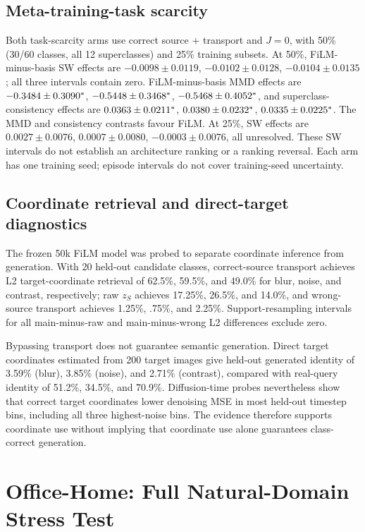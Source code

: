 \subsection{Meta-training-task scarcity}
Both task-scarcity arms use correct source $+$ transport and $J=0$, with 50\% (30/60 classes, all 12 superclasses) and 25\% training subsets. At 50\%, FiLM-minus-basis SW effects are $-0.0098\pm0.0119$, $-0.0102\pm0.0128$, $-0.0104\pm0.0135$; all three intervals contain zero. FiLM-minus-basis MMD effects are $-0.3484\pm0.3090^{\ast}$, $-0.5448\pm0.3468^{\ast}$, $-0.5468\pm0.4052^{\ast}$, and superclass-consistency effects are $0.0363\pm0.0211^{\ast}$, $0.0380\pm0.0232^{\ast}$, $0.0335\pm0.0225^{\ast}$. The MMD and consistency contrasts favour FiLM. At 25\%, SW effects are $0.0027\pm0.0076$, $0.0007\pm0.0080$, $-0.0003\pm0.0076$, all unresolved. These SW intervals do not establish an architecture ranking or a ranking reversal. Each arm has one training seed; episode intervals do not cover training-seed uncertainty.

\subsection{Coordinate retrieval and direct-target diagnostics}
The frozen 50k FiLM model was probed to separate coordinate inference from generation. With 20 held-out candidate classes, correct-source transport achieves L2 target-coordinate retrieval of 62.5\%, 59.5\%, and 49.0\% for blur, noise, and contrast, respectively; raw $z_S$ achieves 17.25\%, 26.5\%, and 14.0\%, and wrong-source transport achieves 1.25\%, .75\%, and 2.25\%. Support-resampling intervals for all main-minus-raw and main-minus-wrong L2 differences exclude zero.

Bypassing transport does not guarantee semantic generation. Direct target coordinates estimated from 200 target images give held-out generated identity of 3.59\% (blur), 3.85\% (noise), and 2.71\% (contrast), compared with real-query identity of 51.2\%, 34.5\%, and 70.9\%. Diffusion-time probes nevertheless show that correct target coordinates lower denoising MSE in most held-out timestep bins, including all three highest-noise bins. The evidence therefore supports coordinate use without implying that coordinate use alone guarantees class-correct generation.

\section{Office-Home: Full Natural-Domain Stress Test}
\label{app:office}

